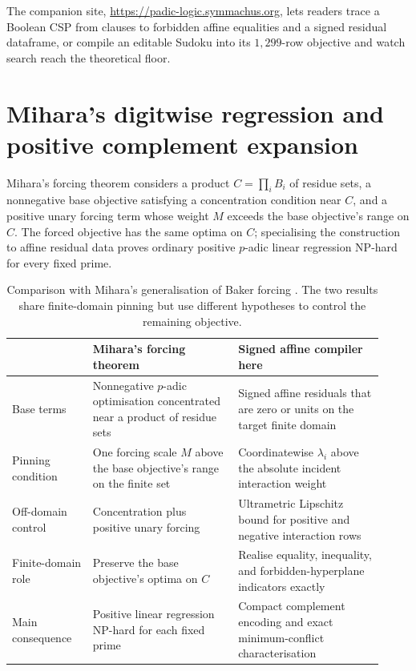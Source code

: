 \documentclass[11pt]{article}
\begin{document}
The companion site, \url{https://padic-logic.symmachus.org}, lets readers trace a Boolean CSP from clauses to forbidden affine equalities and a signed residual dataframe, or compile an editable Sudoku into its \(1{,}299\)-row objective and watch search reach the theoretical floor.

\appendix

\section{Mihara's digitwise regression and positive complement expansion}
\label{app:mihara-digitwise}

Mihara's forcing theorem \cite{mihara2026forcing} considers a product \(C=\prod_i B_i\) of residue sets, a nonnegative base objective satisfying a concentration condition near \(C\), and a positive unary forcing term whose weight \(M\) exceeds the base objective's range on \(C\). The forced objective has the same optima on \(C\); specialising the construction to affine residual data proves ordinary positive \(p\)-adic linear regression NP-hard for every fixed prime.

\begin{table}[H]
\centering
\small
\begin{tabular}{@{}p{0.20\linewidth}p{0.36\linewidth}p{0.36\linewidth}@{}}
\toprule
 & Mihara's forcing theorem & Signed affine compiler here \\
\midrule
Base terms & Nonnegative \(p\)-adic optimisation concentrated near a product of residue sets & Signed affine residuals that are zero or units on the target finite domain \\
Pinning condition & One forcing scale \(M\) above the base objective's range on the finite set & Coordinatewise \(\lambda_i\) above the absolute incident interaction weight \\
Off-domain control & Concentration plus positive unary forcing & Ultrametric Lipschitz bound for positive and negative interaction rows \\
Finite-domain role & Preserve the base objective's optima on \(C\) & Realise equality, inequality, and forbidden-hyperplane indicators exactly \\
Main consequence & Positive linear regression NP-hard for each fixed prime & Compact complement encoding and exact minimum-conflict characterisation \\
\bottomrule
\end{tabular}
\caption{Comparison with Mihara's generalisation of Baker forcing \cite{mihara2026forcing}. The two results share finite-domain pinning but use different hypotheses to control the remaining objective.}
\label{tab:forcing-comparison}
\end{table}
\end{document}
